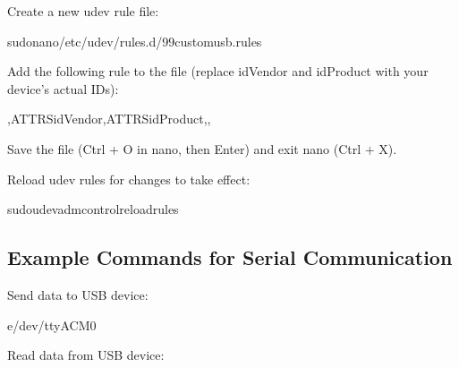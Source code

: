 \documentclass[letterpaper,10pt,english]{sphinxmanual}
\begin{document}
\sphinxAtStartPar
Create a new udev rule file:

\begin{sphinxVerbatim}[commandchars=\\\{\}]
sudonano/etc/udev/rules.d/99\PYGZhy{}custom\PYGZhy{}usb.rules
\end{sphinxVerbatim}

\sphinxAtStartPar
Add the following rule to the file (replace idVendor and idProduct with your device’s actual IDs):

\begin{sphinxVerbatim}[commandchars=\\\{\}]
,ATTRSidVendor,ATTRSidProduct,,
\end{sphinxVerbatim}

\sphinxAtStartPar
Save the file (Ctrl + O in nano, then Enter) and exit nano (Ctrl + X).

\sphinxAtStartPar
Reload udev rules for changes to take effect:

\begin{sphinxVerbatim}[commandchars=\\\{\}]
sudoudevadmcontrol\PYGZhy{}\PYGZhy{}reload\PYGZhy{}rules
\end{sphinxVerbatim}


\subsection{Example Commands for Serial Communication}
\label{\detokenize{cdc:example-commands-for-serial-communication}}
\sphinxAtStartPar
Send data to USB device:

\begin{sphinxVerbatim}[commandchars=\\\{\}]
\PYGZhy{}e\PYGZgt{}/dev/ttyACM0
\end{sphinxVerbatim}

\sphinxAtStartPar
Read data from USB device:
\end{document}
